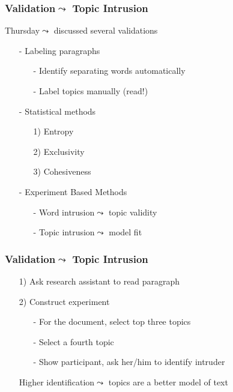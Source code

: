 \documentclass{beamer}
\numberwithin{equation}{section}
\begin{document}
\begin{frame}
\frametitle{Validation$\leadsto$ Topic Intrusion}

Thursday$\leadsto$ discussed several validations

\begin{itemize}
\item[-] Labeling paragraphs
\begin{itemize}
\item[-] Identify separating words automatically
\item[-] Label topics manually (read!)
\end{itemize}
\item[-] Statistical methods
\begin{itemize}
\item[1)] Entropy
\item[2)] Exclusivity
\item[3)] Cohesiveness
\end{itemize}
\item[-] Experiment Based Methods
\begin{itemize}
\item[-] Word intrusion$\leadsto$ topic validity
\item[-] \alert{Topic intrusion}$\leadsto$ model fit
\end{itemize}

\end{itemize}



\end{frame}


\begin{frame}
\frametitle{Validation$\leadsto$ Topic Intrusion}


\begin{itemize}
\item[1)] Ask research assistant to read paragraph
\item[2)] Construct experiment
\begin{itemize}
\item[-] For the document, select top three topics
\item[-] Select a fourth topic
\item[-] Show participant, ask her/him to identify intruder
\end{itemize}

Higher identification$\leadsto$ topics are a better model of text


\end{itemize}

\end{frame}
\end{document}
